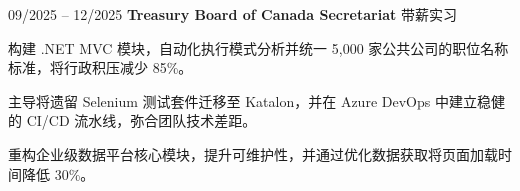\begin{twocolentry}{09/2025 – 12/2025} \textbf{Treasury Board of Canada Secretariat}
\newline 带薪实习 \end{twocolentry}
\begin{onecolentry}
\begin{highlights}
\item 构建 .NET MVC 模块，自动化执行模式分析并统一 5,000 家公共公司的职位名称标准，将行政积压减少 85\%。
\item 主导将遗留 Selenium 测试套件迁移至 Katalon，并在 Azure DevOps 中建立稳健的 CI/CD 流水线，弥合团队技术差距。
\item 重构企业级数据平台核心模块，提升可维护性，并通过优化数据获取将页面加载时间降低 30\%。
\end{highlights}
\end{onecolentry}
